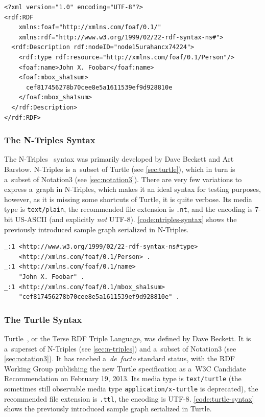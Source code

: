 \begin{lstlisting}[caption={Sample graph in RDF/XML syntax},
  label={code:rdfxml-syntax}]
<?xml version="1.0" encoding="UTF-8"?>
<rdf:RDF
    xmlns:foaf="http://xmlns.com/foaf/0.1/"
    xmlns:rdf="http://www.w3.org/1999/02/22-rdf-syntax-ns#">
  <rdf:Description rdf:nodeID="node15urahancx74224">
    <rdf:type rdf:resource="http://xmlns.com/foaf/0.1/Person"/>
    <foaf:name>John X. Foobar</foaf:name>
    <foaf:mbox_sha1sum>
      cef817456278b70cee8e5a1611539ef9d928810e
    </foaf:mbox_sha1sum>
  </rdf:Description>
</rdf:RDF>
\end{lstlisting}

\subsubsection{The N-Triples Syntax} \label{sec:n-triples}

The N-Triples~\cite{grant2004ntriples} syntax was primarily
developed by Dave Beckett and Art Barstow.
N-Triples is a~subset of Turtle (see \autoref{sec:turtle}),
which in turn is a~subset of Notation3
(see \autoref{sec:notation3}).
There are very few variations to express a~graph in N-Triples,
which makes it an ideal syntax for testing purposes, however,
as it is missing some shortcuts of Turtle, it is quite verbose.
Its media type is \texttt{text/plain}, the recommended file extension is \texttt{.nt},
and the encoding is 7-bit US-ASCII
(and explicitly \emph{not} UTF-8).
\autoref{code:ntriples-syntax} shows the previously
introduced sample graph serialized in N-Triples.

\begin{lstlisting}[caption={Sample graph in N-Triples syntax},
  label={code:ntriples-syntax}]
_:1 <http://www.w3.org/1999/02/22-rdf-syntax-ns#type>
    <http://xmlns.com/foaf/0.1/Person> .
_:1 <http://xmlns.com/foaf/0.1/name>
    "John X. Foobar" .
_:1 <http://xmlns.com/foaf/0.1/mbox_sha1sum>
    "cef817456278b70cee8e5a1611539ef9d928810e" .
\end{lstlisting}

\subsubsection{The Turtle Syntax} \label{sec:turtle}

Turtle~\cite{prudhommeaux2013turtle},
or the Terse RDF Triple Language, was defined by Dave Beckett.
It is a~superset of N-Triples (see \autoref{sec:n-triples}) and
a~subset of Notation3 (see \autoref{sec:notation3}).
It has reached a~\emph{de~facto} standard status,
with the RDF Working Group publishing the new Turtle specification
as a~W3C Candidate Recommendation on February 19, 2013.
Its media type is \texttt{text/turtle}
(the sometimes still observable media type
\texttt{application/x-turtle} is deprecated),
the recommended file extension is \texttt{.ttl},
the encoding is UTF-8.
\autoref{code:turtle-syntax} shows the previously
introduced sample graph serialized in Turtle.

